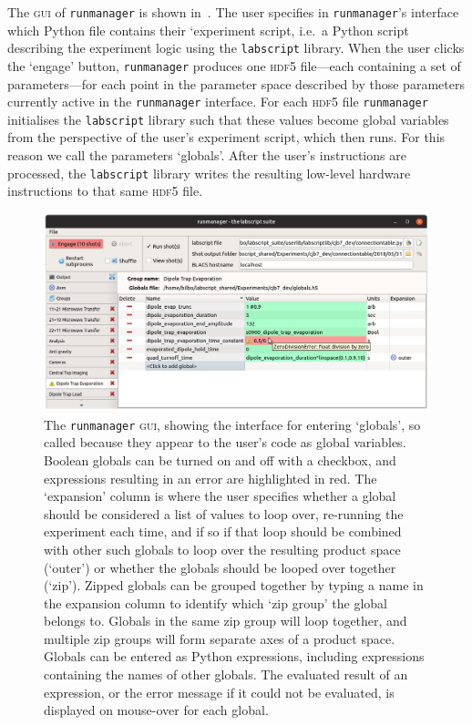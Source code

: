 The \textsc{gui} of \texttt{runmanager} is shown in~. The user specifies in \texttt{runmanager}'s interface which Python file contains their `experiment script, i.e.~a Python script describing the experiment logic using the \texttt{labscript} library. When the user clicks the `engage' button, \texttt{runmanager} produces one \textsc{hdf5} file---each containing a set of parameters---for each point in the parameter space described by those parameters currently active in the \texttt{runmanager} interface. For each \textsc{hdf5} file \texttt{runmanager} initialises the \texttt{labscript} library such that these values become global variables from the perspective of the user's experiment script, which then runs. For this reason we call the parameters `globals'. After the user's instructions are processed, the \texttt{labscript} library writes the resulting low-level hardware instructions to that same \textsc{hdf5} file.

\begin{figure}[t]
\begin{center}
\includegraphics[width=\textwidth]{figures/software/new_screenshots/runmanager.png}
\caption{The \texttt{runmanager} \textsc{gui}, showing the interface for entering `globals', so called because they appear to the user's code as global variables. Boolean globals can be turned on and off with a checkbox, and expressions resulting in an error are highlighted in red. The `expansion' column is where the user specifies whether a global should be considered a list of values to loop over, re-running the experiment each time, and if so if that loop should be combined with other such globals to loop over the resulting product space (`outer') or whether the globals should be looped over together (`zip'\protect\footnotemark). Zipped globals can be grouped together by typing a name in the expansion column to identify which `zip group' the global belongs to. Globals in the same zip group will loop together, and multiple zip groups will form separate axes of a product space. Globals can be entered as Python expressions, including expressions containing the names of other globals. The evaluated result of an expression, or the error message if it could not be evaluated, is displayed on mouse-over for each global.}\label{fig:runmanager}
\end{center}
\end{figure}

